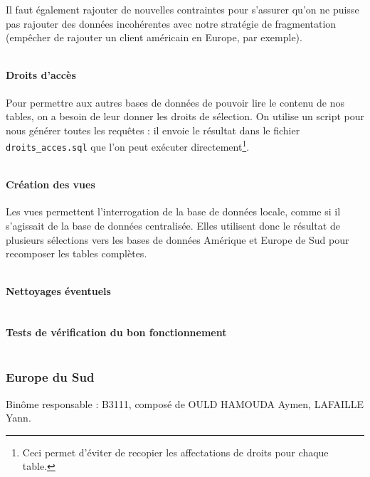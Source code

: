 \documentclass[10pt,a4paper]{article}
\theoremstyle{plain}
\begin{document}
\inputminted{sql}{INSA-DB12-EuropeNord-trigger.sql}

Il faut également rajouter de nouvelles contraintes pour s'assurer qu'on ne puisse pas rajouter des données incohérentes avec notre stratégie de fragmentation (empêcher de rajouter un client américain en Europe, par exemple).

\inputminted{sql}{INSA-DB12-EuropeNord-contraintes.sql}

\newpage

\paragraph{Droits d'accès}

Pour permettre aux autres bases de données de pouvoir lire le contenu de nos tables, on a besoin de leur donner les droits de sélection. On utilise un script pour nous générer toutes les requêtes : il envoie le résultat dans le fichier \verb|droits_acces.sql| que l'on peut exécuter directement\footnote{Ceci permet d'éviter de recopier les affectations de droits pour chaque table.}.
\inputminted{sql}{INSA-DB12-droits-acces.sql}
\newpage

\paragraph{Création des vues}

Les vues permettent l'interrogation de la base de données locale, comme si il s'agissait de la base de données centralisée. Elles utilisent donc le résultat de plusieurs sélections vers les bases de données Amérique et Europe de Sud pour recomposer les tables complètes.

\inputminted{sql}{INSA-DB12-EuropeNord-vues.sql}

\newpage

\paragraph{Nettoyages éventuels}

\inputminted{sql}{INSA-DB12-EuropeNord-drop.sql}

\paragraph{Tests de vérification du bon fonctionnement}

\inputminted{sql}{INSA-DB12-EuropeNord-bon-fonctionnement.sql}
\newpage

\subsubsection{Europe du Sud}
Binôme responsable : B3111, composé de OULD HAMOUDA Aymen, LAFAILLE Yann.\\
\end{document}
